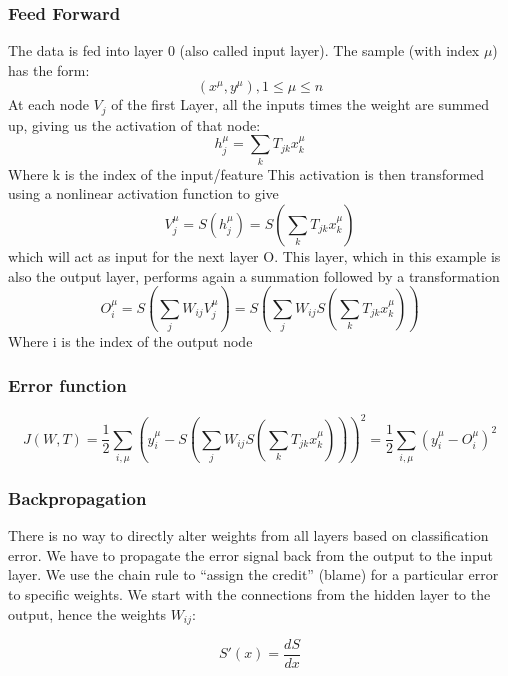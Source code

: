 \documentclass[main]{subfiles}
\begin{document}
\subsubsection{Feed Forward}
The data is fed into layer 0 (also called input layer). 
The sample (with index $\mu$)   has the form:
\begin{equation}
(x^{\mu},y^{\mu}),  1 \leq \mu \leq n 
\end{equation}
At each node $V_j$ of the first Layer, all the inputs times the weight are summed up, giving us the activation of that node:
\begin{equation}
h_j^{\mu}=\sum_k T_{jk}x_k^{\mu}
\end{equation}
Where k is the index of the input/feature
This activation is then transformed using a nonlinear activation function to give
\begin{equation}
V_j^{\mu}=S(h_j^{\mu})=S(\sum_k T_{jk}x_k^{\mu})
\end{equation}
which will act as input for the next layer O. This layer, which in this example is also the output layer, performs again a summation followed by a transformation
\begin{equation}
O_i^{\mu}=S(\sum_j W_{ij}V_j^{\mu})=S(\sum_j W_{ij}S(\sum_k T_{jk}x_k^{\mu}))
\end{equation}
Where i is the index of the output node

\subsubsection{Error function}
\begin{equation}
J(W,T)=\frac{1}{2}\sum_{i,\mu}(y_i^{\mu}-S(\sum_j W_{ij}S(\sum_k T_{jk}x_k^{\mu})))^2=\frac{1}{2}\sum_{i,\mu}(y_i^{\mu}-O_i^{\mu})^2
\end{equation}

\subsubsection{Backpropagation}
There is no way to directly alter weights from all layers based on classification error. We have to propagate the error signal back from the output to the input layer. We use the chain rule to “assign the credit” (blame) for a
particular error to specific weights.
We start with the connections from the hidden layer to the output, hence the weights $W_{ij}$:

\begin{equation}
S'(x) = \frac{dS}{dx}
\end{equation}
\end{document}
